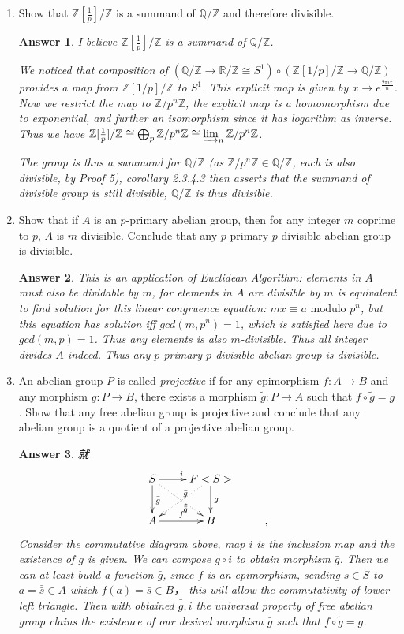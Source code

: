 \documentclass[11pt,leqno]{article}
\newcommand{\Q}{{\mathbb Q}}
\newcommand{\Z}{{\mathbb Z}}
\newcommand{\R}{{\mathbb R}}
\newcommand{\<}[1]{{\langle}#1 {\rangle}}
\theoremstyle{plain}
\newtheorem*{answer*}{Answer}
\theoremstyle{definition}
\theoremstyle{remark}
\numberwithin{equation}{section}
\begin{document}
\begin{enumerate}
    
\item Show that $\Z[\frac{1}{p}]/\Z$ is a summand of $\Q/\Z$ and therefore divisible.
    \begin{answer*}
    I believe  $\Z[\frac{1}{p}]/\Z$ is a summand of $\Q/\Z$.
    
     We noticed that composition of $ (\Q/\Z \rightarrow \R/\Z\cong S^1) \circ (\Z[1/p]/\Z \rightarrow \Q/\Z)  $  provides a map from $\Z[1/p]/\Z$ to $S^1$. This explicit map is given by $x\rightarrow e^{\frac{2\pi ix}{n}}$. Now we restrict the map to $\Z/p^n\Z$, the explicit map is a homomorphism due to exponential, and further an isomorphism since it has logarithm as inverse. Thus we have $\Z[\frac{1}{p}]/\Z \cong \bigoplus_p \Z/p^n\Z \cong \varinjlim_n{\Z/p^n\Z}$. 
     
     The group is thus a summand for $\Q/\Z$ (as $\Z/p^n\Z \in \Q/\Z$, each is also divisible, by Proof 5), corollary 2.3.4.3 then asserts that the summand of divisible group is still divisible, $\Q/\Z$ is thus divisible. 
     
    \end{answer*}


\item Show that if $A$ is an $p$-primary abelian group, then for any integer $m$ coprime to $p$, $A$ is $m$-divisible.  Conclude that any $p$-primary $p$-divisible abelian group is divisible.
    \begin{answer*}
    This is an application of Euclidean Algorithm: elements in $A$ must also be dividable by $m$, for  elements in $A$ are divisible by $m$ is equivalent to find solution for this linear congruence equation: $mx \equiv a \textrm{ modulo } p^n $, but this equation has solution iff $gcd(m,p^n)=1$, which is satisfied here due to $gcd(m,p)=1$. Thus any elements is also $m$-divisible. Thus all integer divides $A$ indeed. Thus any $p$-primary $p$-divisible abelian group is divisible.
    \end{answer*} 


\item An abelian group $P$ is called {\em projective} if for any epimorphism $f: A \to B$ and any morphism $g: P \to B$, there exists a morphism $\tilde{g}: P \to A$ such that $f \circ \tilde{g} = g$.  Show that any free abelian group is projective and conclude that any abelian group is a quotient of a projective abelian group.
    \begin{answer*}
    就 
    \[
    \xymatrix{
     S \ar[r]^{i}\ar[d]^{\bar{\bar{g}}}\ar@{.>}[dr]^{\bar{g}} & \ar[d]^{g}\ar@{.>}[dl]^{\tilde{{\bar{\bar{g}}}}} F<S> & \\
     A \ar[r]^{f} & B &,
    }
    \]
    Consider the commutative diagram above, map $i$ is the inclusion map and the existence of $g$ is given. We can compose $g\circ i$ to obtain morphism $\bar{g}$.
    Then we can at least build a function $\bar{\bar{g}}$, since $f$ is an epimorphism, sending $s\in S$ to $a=\bar{\bar{s}} \in A$ which $f(a)=\bar{s} \in B$， this will allow the commutativity of lower left triangle. Then with obtained $\bar{\bar{g}}, i$ the universal property of free abelian group clains the existence of our desired morphism $\bar{g}$ such that $f \circ \tilde{g} = g$. 
    

\end{answer*}
\end{enumerate}
\end{document}
